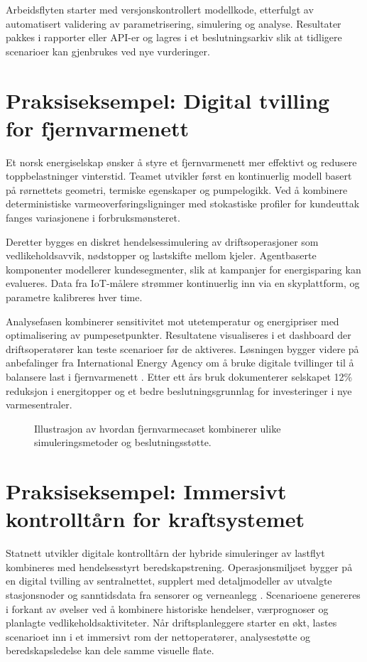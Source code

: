 Arbeidsflyten starter med versjonskontrollert modellkode, etterfulgt av automatisert validering av parametrisering, simulering og analyse. Resultater pakkes i rapporter eller API-er og lagres i et beslutningsarkiv slik at tidligere scenarioer kan gjenbrukes ved nye vurderinger.

\section{Praksiseksempel: Digital tvilling for fjernvarmenett}
Et norsk energiselskap ønsker å styre et fjernvarmenett mer effektivt og redusere toppbelastninger vinterstid. Teamet utvikler først en kontinuerlig modell basert på rørnettets geometri, termiske egenskaper og pumpelogikk. Ved å kombinere deterministiske varmeoverføringsligninger med stokastiske profiler for kundeuttak fanges variasjonene i forbruksmønsteret.

Deretter bygges en diskret hendelsessimulering av driftsoperasjoner som vedlikeholdsavvik, nødstopper og lastskifte mellom kjeler. Agentbaserte komponenter modellerer kundesegmenter, slik at kampanjer for energisparing kan evalueres. Data fra IoT-målere strømmer kontinuerlig inn via en skyplattform, og parametre kalibreres hver time.

Analysefasen kombinerer sensitivitet mot utetemperatur og energipriser med optimalisering av pumpesetpunkter. Resultatene visualiseres i et dashboard der driftsoperatører kan teste scenarioer før de aktiveres. Løsningen bygger videre på anbefalinger fra International Energy Agency om å bruke digitale tvillinger til å balansere last i fjernvarmenett \citep{iea2021district}. Etter ett års bruk dokumenterer selskapet 12\% reduksjon i energitopper og et bedre beslutningsgrunnlag for investeringer i nye varmesentraler.

\begin{figure}[htbp]
    \centering
    \caption{Illustrasjon av hvordan fjernvarmecaset kombinerer ulike simuleringsmetoder og beslutningsstøtte.}
    \label{fig:kap04-fjernvarmecase}
\end{figure}

\section{Praksiseksempel: Immersivt kontrolltårn for kraftsystemet}
Statnett utvikler digitale kontrolltårn der hybride simuleringer av lastflyt kombineres med hendelsesstyrt beredskapstrening. Operasjonsmiljøet bygger på en digital tvilling av sentralnettet, supplert med detaljmodeller av utvalgte stasjonsnoder og sanntidsdata fra sensorer og verneanlegg \citep{statnett2024kontrolltarn}. Scenarioene genereres i forkant av øvelser ved å kombinere historiske hendelser, værprognoser og planlagte vedlikeholdsaktiviteter. Når driftsplanleggere starter en økt, lastes scenarioet inn i et immersivt rom der nettoperatører, analysestøtte og beredskapsledelse kan dele samme visuelle flate.

